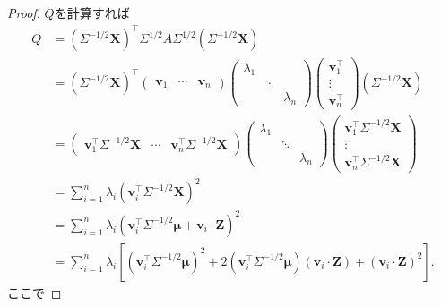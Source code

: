 \begin{proof}
  \(Q\)を計算すれば
  \begin{align*}
    Q
    &= (\Sigma^{-1/2} \boldsymbol{X})^\top \Sigma^{1/2} A \Sigma^{1/2} (\Sigma^{-1/2} \boldsymbol{X}) \\
    &= (\Sigma^{-1/2} \boldsymbol{X})^\top
    \begin{pmatrix}
      \boldsymbol{v}_1 & \cdots & \boldsymbol{v}_n
    \end{pmatrix}
    \begin{pmatrix}
      \lambda_1 & & \\
      & \ddots & \\
      & & \lambda_n
    \end{pmatrix}
    \begin{pmatrix}
      \boldsymbol{v}_1^\top \\ \vdots \\ \boldsymbol{v}_n^\top
    \end{pmatrix}
    (\Sigma^{-1/2} \boldsymbol{X}) \\
    &=
    \begin{pmatrix}
      \boldsymbol{v}_1^\top \Sigma^{-1/2} \boldsymbol{X} & \cdots & \boldsymbol{v}_n^\top \Sigma^{-1/2} \boldsymbol{X}
    \end{pmatrix}
    \begin{pmatrix}
      \lambda_1 & & \\
      & \ddots & \\
      & & \lambda_n
    \end{pmatrix}
    \begin{pmatrix}
      \boldsymbol{v}_1^\top \Sigma^{-1/2} \boldsymbol{X} \\ \vdots \\ \boldsymbol{v}_n^\top \Sigma^{-1/2} \boldsymbol{X}
    \end{pmatrix}
    \\
    &= \sum_{i=1}^n \lambda_i \left( \boldsymbol{v}_i^\top \Sigma^{-1/2} \boldsymbol{X} \right)^2 \\
    &= \sum_{i=1}^n \lambda_i \left( \boldsymbol{v}_i^\top \Sigma^{-1/2} \boldsymbol{\mu} + \boldsymbol{v}_i \cdot \boldsymbol{Z} \right)^2 \\
    &= \sum_{i=1}^n \lambda_i
    \left[
      (\boldsymbol{v}_i^\top \Sigma^{-1/2} \boldsymbol{\mu})^2
      + 2(\boldsymbol{v}_i^\top \Sigma^{-1/2} \boldsymbol{\mu})(\boldsymbol{v}_i \cdot \boldsymbol{Z})
      + (\boldsymbol{v}_i \cdot \boldsymbol{Z})^2
    \right] .
  \end{align*}
  ここで

\end{proof}
